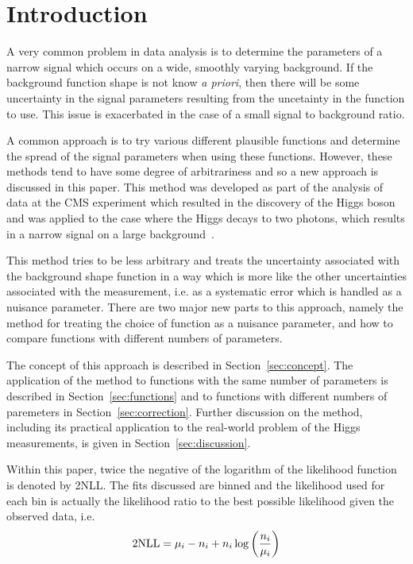 \section{Introduction}
\label{sec:introduction}

A very common problem in data analysis is to determine the parameters of
a narrow signal which occurs on a wide, smoothly varying background. If the
background function shape is not know {\it a priori}, then there will be 
some uncertainty in the signal parameters resulting from the uncetainty in
the function to use. This issue is exacerbated in the case of a small signal to
background ratio.

A common approach is to try various different plausible functions and 
determine the spread of the signal parameters when using these functions.
However, these methods tend to have some degree of arbitrariness and so
a new approach is discussed in this paper.
This method was developed as part of the analysis of data at the CMS experiment
which resulted in the discovery of the Higgs
boson and was applied to the case where the Higgs decays to two photons, which
results in a narrow signal on a large background~\cite{ref:introduction:higgs}.

This method tries to be less 
arbitrary and treats the uncertainty associated with the
background shape function in a way
which is more like the other
uncertainties associated with the measurement, i.e. as a systematic error
which is handled as a nuisance parameter.
There are two major new parts to this approach, namely the method for
treating the choice of function as a nuisance parameter, and how to compare 
functions with different numbers of parameters.


The concept of this approach is described in Section~\ref{sec:concept}.
The application of the method to functions with the same number of parameters
is described in Section~\ref{sec:functions} and to functions with different
numbers of paremeters in Section~\ref{sec:correction}. Further discussion on
the method, including its practical application to the real-world problem of
the Higgs measurements, is given in Section~\ref{sec:discussion}.

Within this paper, twice the negative of the logarithm of the likelihood
function is denoted by 2NLL. The fits discussed are binned and the 
likelihood used for each bin is actually the likelihood ratio to the best
possible likelihood given the observed data, i.e.
\begin{displaymath}
{\rm 2NLL} = \mu_i - n_i + n_i \log\left(\frac{n_i}{\mu_i}\right)
\end{displaymath}

